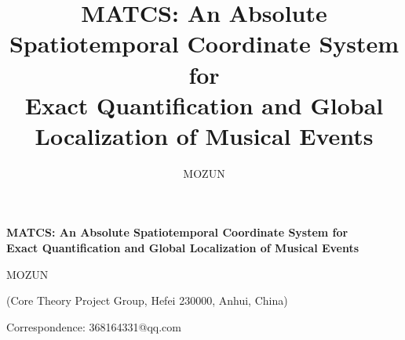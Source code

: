 \documentclass[11pt,a4paper]{article}
\title{MATCS: An Absolute Spatiotemporal Coordinate System for\\
Exact Quantification and Global Localization of Musical Events}
\author{MOZUN}
\date{}
\begin{document}
\thispagestyle{empty}

\begin{center}
{\sffamily\bfseries\fontsize{17}{21}\selectfont
 MATCS: An Absolute Spatiotemporal Coordinate System for\\[0.18em]
 Exact Quantification and Global Localization of Musical Events\par}

\vspace{0.9em}
{\normalsize MOZUN\par}
\vspace{0.35em}
{\small (Core Theory Project Group, Hefei 230000, Anhui, China)\par}
\vspace{0.25em}
{\small Correspondence: 368164331@qq.com\par}
\end{center}
\end{document}
